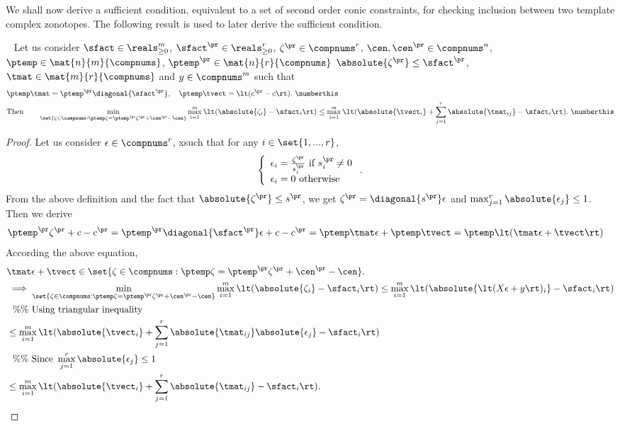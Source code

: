 We shall now derive a sufficient condition, equivalent to a set of
second order conic constraints, for checking inclusion between two
template complex zonotopes.  The following result is used to later derive
the sufficient condition.
%
\begin{lemma}~\label{lem:transfer-matrix}
  Let us consider ${\sfact\in\reals^m_{\geq 0}}$,
  ${\sfact^\pr\in\reals^r_{\geq 0}}$, ${\zeta^\pr\in\compnums^r}$,
  ${\cen,\cen^\pr\in\compnums^n}$,${\ptemp\in\mat{n}{m}{\compnums}}$, ${\ptemp^\pr\in\mat{n}{r}{\compnums}}$ 
  ${\absolute{\zeta^\pr}\leq\sfact^\pr}$,
  ${\tmat\in\mat{m}{r}{\compnums}}$  and ${y\in\compnums^m}$ such that
  \begin{align*}
&
    \ptemp\tmat=\ptemp^\pr\diagonal{\sfact^\pr},\hspace{1em}\ptemp\tvect=\lt(c^\pr-c\rt).~\numberthis\label{eqn:inclusion1}
    \\
&\text{Then}\hspace{2em}\min_{\set{\zeta\in\compnums:\ptemp\zeta=\ptemp^\pr\zeta^\pr+\cen^\pr-\cen}}\max_{i=1}^m\lt(\absolute{\zeta_i}-\sfact_i\rt)\leq \max_{i=1}^m\lt(\absolute{\tvect_i}+\sum_{j=1}^r\absolute{\tmat_{ij}}-\sfact_i\rt).~\numberthis\label{eqn:transfer-matrix}
\end{align*}
%
\end{lemma}
%
\begin{proof}
  Let us consider $\epsilon\in\compnums^{r}$, xsuch that for any $i\in\set{1,...,r}$,
%
\[\left\{
\begin{array}{l}
\epsilon_i=\frac{\zeta^\pr}{s^\pr_i}~\text{if}~ s^\pr_i\neq 0\\
\epsilon_i=0~\text{otherwise}
\end{array}
\right..\]
%
From the above definition and the fact that $\absolute{\zeta^\pr}\leq
s^\pr$, we get $\zeta^\pr=\diagonal{s^\pr}\epsilon$ and
$\max_{j=1}^r\absolute{\epsilon_j}\leq 1$.  Then we derive
%
\begin{align*}
&\ptemp^\pr\zeta^\pr+c-c^\pr
=\ptemp^\pr\diagonal{\sfact^\pr}\epsilon+c-c^\pr
=\ptemp\tmat\epsilon+\ptemp\tvect
=\ptemp\lt(\tmat\epsilon+\tvect\rt)
\end{align*}
%
According the above equation,
%
\begin{align*}
& \tmat\epsilon+\tvect\in\set{\zeta\in\compnums:\ptemp\zeta=\ptemp^\pr\zeta^\pr+\cen^\pr-\cen}.\\
& \implies
  \min_{\set{\zeta\in\compnums:\ptemp\zeta=\ptemp^\pr\zeta^\pr+\cen^\pr-\cen}}\max_{i=1}^m\lt(\absolute{\zeta_i}-\sfact_i\rt)\leq
  \max_{i=1}^m\lt(\absolute{\lt(X\epsilon+y\rt)_i}-\sfact_i\rt)\\
&   ~~\%\%~\text{Using triangular inequality}\\
&\leq \max_{i=1}^m\lt(\absolute{\tvect_i}+\sum_{j=1}^r\absolute{\tmat_{ij}}\absolute{\epsilon_j}-\sfact_i\rt)\\
& ~~\%\%~\text{Since}~\max_{j=1}^r\absolute{\epsilon_j}\leq 1\\
& \leq  \max_{i=1}^m\lt(\absolute{\tvect_i}+\sum_{j=1}^r\absolute{\tmat_{ij}}-\sfact_i\rt).\hspace{3em}\qedhere
\end{align*}
%
\end{proof}
